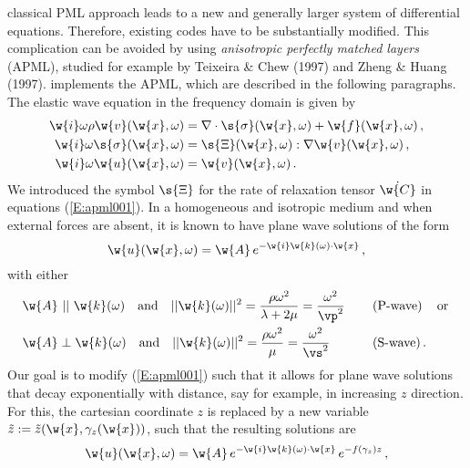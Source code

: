 classical PML approach leads to a new and generally larger system of
differential equations. Therefore, existing codes have to be
substantially modified. This complication can be avoided by using
\emph{anisotropic perfectly matched layers} (APML), studied for
example by Teixeira \& Chew (1997) and Zheng \& Huang (1997). \SES implements the APML, which are described in the following paragraphs.\\[5pt]
The elastic wave equation in the frequency domain is given by
\begin{subequations}\label{E:apml001}
\begin{align}
\w{i}\omega \rho \w{v}(\w{x},\omega) &= \nabla\cdot\s{\sigma}(\w{x},
\omega) + \w{f}(\w{x},\omega)\,,\label{E:apml001a}\\
\w{i}\omega \s{\sigma}(\w{x},\omega) &=
\s{\Xi}(\w{x},\omega):\nabla \w{v}(\w{x},\omega)\,,\label{E:apml001b}\\
\w{i}\omega \w{u}(\w{x},\omega) &=
\w{v}(\w{x},\omega)\,.\label{E:apml001c}
\end{align}
\end{subequations}
We introduced the symbol $\s{\Xi}$ for the rate of relaxation tensor
$\dot{\w{C}}$ in equations (\ref{E:apml001}). In a homogeneous and
isotropic medium and when external forces are absent, it is known to
have plane wave solutions of the form
\begin{equation}\label{E:apml002}
\w{u}(\w{x},\omega)=\w{A}\,e^{-\w{i}\w{k}(\omega)\cdot \w{x}}\,,
\end{equation}
with either
\begin{subequations}
\begin{align}
&\w{A}\,\, ||\,\, \w{k}(\omega)\quad\text{and}\quad
||\w{k}(\omega)||^2=\frac{\rho\omega^2}{\lambda+2\mu}=\frac{\omega^2}{\vp^2}\,\quad&&\text{(P-wave)}\,\quad\text{or}\,\label{E:apml003}\\
&\w{A}\perp\w{k}(\omega)\quad\text{and}\quad
||\w{k}(\omega)||^2=\frac{\rho\omega^2}{\mu}=\frac{\omega^2}{\vs^2}\,\quad&&\text{(S-wave)}\,.\label{E:apml004}
\end{align}
\end{subequations}
Our goal is to modify (\ref{E:apml001}) such that it allows for
plane wave solutions that decay exponentially with distance, say for
example, in increasing $z$ direction. For this, the cartesian
coordinate $z$ is replaced by a new variable
$\tilde{z}:=\tilde{z}(\w{x},\gamma_z(\w{x}))$, such that the
resulting solutions are
\begin{equation}\label{E:apml005}
\w{u}(\w{x}, \omega)=
\w{A}\,e^{-\w{i}\w{k}(\omega)\cdot\w{x}}\,e^{-f(\gamma_z) z}\,,
\end{equation}
